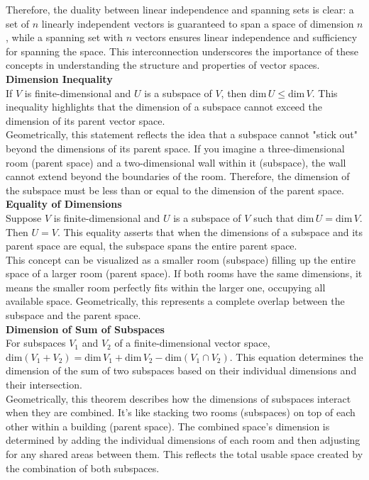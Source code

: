 Therefore, the duality between linear independence and spanning sets is clear: a set of $n$ linearly independent vectors is guaranteed to span a space of dimension $n$, while a spanning set with $n$ vectors ensures linear independence and sufficiency for spanning the space. This interconnection underscores the importance of these concepts in understanding the structure and properties of vector spaces.
\\

\textbf{Dimension Inequality}\\
If \(V\) is finite-dimensional and \(U\) is a subspace of \(V\), then \(\text{dim} \, U \leq \text{dim} \, V\). This inequality highlights that the dimension of a subspace cannot exceed the dimension of its parent vector space.
\\

Geometrically, this statement reflects the idea that a subspace cannot "stick out" beyond the dimensions of its parent space. If you imagine a three-dimensional room (parent space) and a two-dimensional wall within it (subspace), the wall cannot extend beyond the boundaries of the room. Therefore, the dimension of the subspace must be less than or equal to the dimension of the parent space.
\\

\textbf{Equality of Dimensions}\\
Suppose \(V\) is finite-dimensional and \(U\) is a subspace of \(V\) such that \(\text{dim} \, U = \text{dim} \, V\). Then \(U = V\). This equality asserts that when the dimensions of a subspace and its parent space are equal, the subspace spans the entire parent space.
\\

This concept can be visualized as a smaller room (subspace) filling up the entire space of a larger room (parent space). If both rooms have the same dimensions, it means the smaller room perfectly fits within the larger one, occupying all available space. Geometrically, this represents a complete overlap between the subspace and the parent space.
\\

\textbf{Dimension of Sum of Subspaces}\\
For subspaces \(V_1\) and \(V_2\) of a finite-dimensional vector space, \(\text{dim}(V_1 + V_2) = \text{dim} \, V_1 + \text{dim} \, V_2 - \text{dim}(V_1 \cap V_2)\). This equation determines the dimension of the sum of two subspaces based on their individual dimensions and their intersection.
\\

Geometrically, this theorem describes how the dimensions of subspaces interact when they are combined. It's like stacking two rooms (subspaces) on top of each other within a building (parent space). The combined space's dimension is determined by adding the individual dimensions of each room and then adjusting for any shared areas between them. This reflects the total usable space created by the combination of both subspaces.
\\
